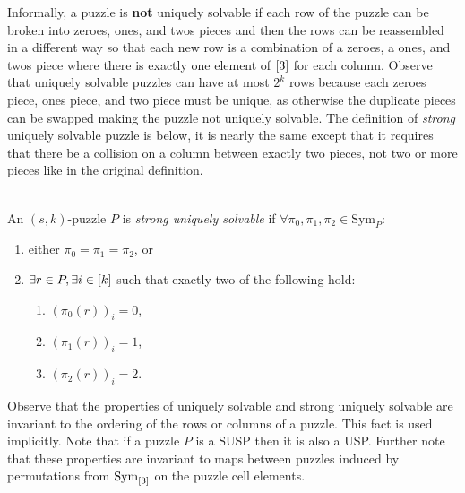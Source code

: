 \documentclass[11pt]{article}
\newcommand\Sym[1]{\ensuremath{\mathrm{Sym}_{#1}}}
\begin{document}
Informally, a puzzle is \textbf{not} uniquely solvable if each row of
the puzzle can be broken into zeroes, ones, and twos pieces and then
the rows can be reassembled in a different way so that each new row is
a combination of a zeroes, a ones, and twos piece where there is
exactly one element of $[3]$ for each column.  Observe that
uniquely solvable puzzles can have at most $2^k$ rows because each
zeroes piece, ones piece, and two piece must be unique, as otherwise
the duplicate pieces can be swapped making the puzzle not uniquely
solvable.  The definition of \emph{strong} uniquely solvable puzzle is
below, it is nearly the same except that it requires that there be a
collision on a column between exactly two pieces, not two or more
pieces like in the original definition.

\begin{definition}
  ~\\
  An $(s,k)$-puzzle $P$ is \emph{strong uniquely solvable} if
  $\forall \pi_0, \pi_1, \pi_2 \in \Sym{P}:$
  \begin{enumerate}
  \item either $\pi_0 = \pi_1 = \pi_2$, or
  \item $\exists r \in P, \exists i \in [k]$ such that exactly two
    of the following hold:
    \begin{enumerate}
    \item $(\pi_0(r))_i = 0$,
    \item $(\pi_1(r))_i = 1$,
    \item $(\pi_2(r))_i = 2$.
    \end{enumerate}
  \end{enumerate}

\end{definition}

Observe that the properties of uniquely solvable and strong uniquely
solvable are invariant to the ordering of the rows or columns of a
puzzle.  This fact is used implicitly.  Note that if a puzzle $P$ is a
SUSP then it is also a USP.  Further note that these properties are
invariant to maps between puzzles induced by permutations from
\Sym{\ordset{3}} on the puzzle cell elements.
\end{document}

